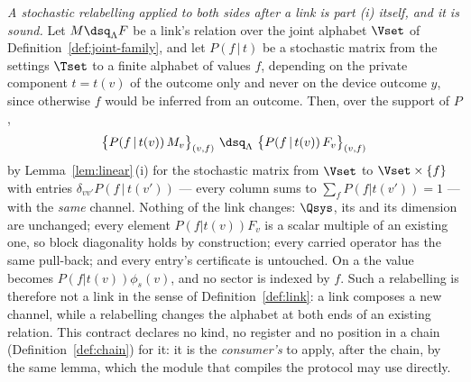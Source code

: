 \begin{remark}
\emph{A stochastic relabelling applied to both sides after a link is part (i)
itself, and it is sound.} Let $M\dsq_{\Lambda}F$ be a link's relation over
the joint alphabet $\Vset$ of Definition~\ref{def:joint-family}, and let
$P(f\,|\,t)$ be a stochastic matrix from the settings $\Tset$ to a finite
alphabet of values $f$, depending on the private component $t=t(v)$ of the
outcome only and never on the device outcome $y$, since otherwise $f$ would
be inferred from an outcome. Then, over the support of $P$,
\begin{equation}\label{eq:relabel}
  \big\{P(f\,|\,t(v))\,M_v\big\}_{(v,f)}\ \dsq_{\Lambda}\
  \big\{P(f\,|\,t(v))\,F_v\big\}_{(v,f)}
\end{equation}
by Lemma~\ref{lem:linear}\,(i) for the stochastic matrix from $\Vset$ to
$\Vset\times\{f\}$ with entries $\delta_{vv'}P(f\,|\,t(v'))$ --- every column
sums to $\sum_fP(f|t(v'))=1$ --- with the \emph{same} channel. Nothing of the
link changes: $\Qsys$, its \tref{sector map} and its dimension are unchanged;
every element $P(f|t(v))F_v$ is a scalar multiple of an existing one, so
block diagonality holds by construction; every carried operator has the
same pull-back; and every entry's certificate is untouched. On a
\tref{scalar sector} the value becomes $P(f|t(v))\phi_s(v)$, and no sector is indexed by
$f$. Such a relabelling is therefore not a link in the sense of
Definition~\ref{def:link}: a link composes a new channel, while a relabelling
changes the alphabet at both ends of an existing relation. This contract
declares no kind, no register and no position in a chain
(Definition~\ref{def:chain}) for it: it is the \emph{consumer's} to apply,
after the chain, by the same lemma, which the module that compiles the
protocol may use directly.
\end{remark}
